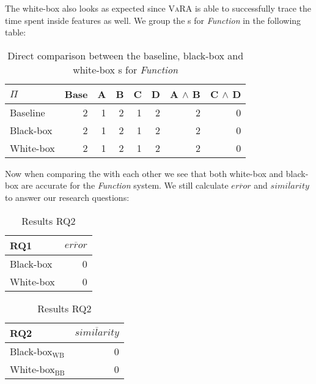 The white-box {\perfInfluenceModel} also looks as expected since \textsc{VaRA} is able to successfully trace the time 
spent inside features as well. We group the {\perfInfluenceModel}s for \emph{Function} in the following table:

\begin{table}[H]
    \centering
    \begin{tabular}{lrrrrrrr}
    \toprule
    $\Pi$    & Base & A & B & C & D & A $\land$ B & C $\land$ D  \\ \midrule
    Baseline & 2    & 1 & 2 & 1 & 2 & 2           & 0            \\
    Black-box & 2   & 1 & 2 & 1 & 2 & 2           & 0            \\
    White-box & 2   & 1 & 2 & 1 & 2 & 2           & 0            \\ \bottomrule
    \end{tabular}  
    \caption{Direct comparison between the baseline, black-box and white-box {\perfInfluenceModel}s for \emph{Function}}\label{aggr:results-function}
\end{table}

Now when comparing the {\perfInfluenceModel} with each other we see that both white-box and black-box are accurate for the \emph{Function}
system. We still calculate $\overline{error}$ and $\overline{similarity}$ to answer our research questions:

\begin{table}[H]
    \begin{minipage}{.5\linewidth}
        \centering
        \begin{tabular}{lr}
        \toprule
        RQ1     & $\overline{error}$         \\ \midrule
        Black-box & 0              \\
        White-box & 0              \\ \bottomrule
        \end{tabular}  
        \caption{Results RQ1}
    \end{minipage}%
    \begin{minipage}{.5\linewidth}
        \centering
        \begin{tabular}{lr}
            \toprule
            RQ2     & $\overline{similarity}$   \\ \midrule
            Black-box$_\text{WB}$ & 0              \\
            White-box$_\text{BB}$ & 0              \\ \bottomrule
            \end{tabular}  
            \caption{Results RQ2}
    \end{minipage} 
    \end{table}

